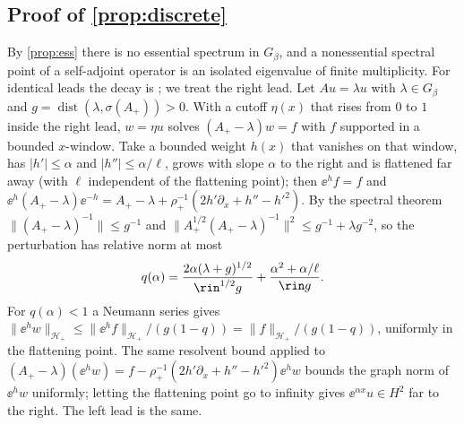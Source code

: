 \subsection{Proof of \texorpdfstring{\cref{prop:discrete}}{Proposition 2.3}}\label{sm:proof-discrete}
By \cref{prop:ess} there is no essential spectrum in $G_\beta$, and a
nonessential spectral point of a self-adjoint operator is an isolated
eigenvalue of finite multiplicity. For identical leads the decay is
\cite[Thm.~3.5]{Fliss2013}; we treat the right lead. Let $Au=\lambda u$ with
$\lambda\in G_\beta$ and $g=\operatorname{dist}(\lambda,\sigma(A_+))>0$. With a
cutoff $\eta(x)$ that rises from $0$ to $1$ inside the right lead, $w=\eta u$
solves $(A_+-\lambda)w=f$ with $f$ supported in a bounded $x$-window. Take a
bounded weight $h(x)$ that vanishes on that window, has $|h'|\le\alpha$ and
$|h''|\le\alpha/\ell$, grows with slope $\alpha$ to the right and is flattened
far away (with $\ell$ independent of the flattening point); then $\ee^hf=f$ and
$\ee^h(A_+-\lambda)\ee^{-h}=A_+-\lambda+\rho_+^{-1}(2h'\partial_x+h''-h'^2)$.
By the spectral theorem $\|(A_+-\lambda)^{-1}\|\le g^{-1}$ and
$\|A_+^{1/2}(A_+-\lambda)^{-1}\|^2\le g^{-1}+\lambda g^{-2}$, so the
perturbation has relative norm at most
\[
  q(\alpha)=\frac{2\alpha(\lambda+g)^{1/2}}{\rin^{1/2}g}
  +\frac{\alpha^2+\alpha/\ell}{\rin g}.
\]
For $q(\alpha)<1$ a Neumann series gives
$\|\ee^hw\|_{\mathcal H_+}\le\|\ee^hf\|_{\mathcal H_+}/(g(1-q))
=\|f\|_{\mathcal H_+}/(g(1-q))$, uniformly in the flattening point. The same
resolvent bound applied to
$(A_+-\lambda)(\ee^hw)=f-\rho_+^{-1}(2h'\partial_x+h''-h'^2)\ee^hw$ bounds the
graph norm of $\ee^hw$ uniformly; letting the flattening point go to infinity
gives $\ee^{\alpha x}u\in H^2$ far to the right. The left lead is the same.

